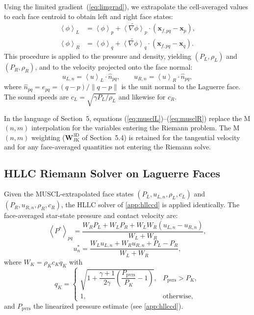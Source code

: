 \documentclass[twocolumn]{aastex63}
\newcommand{\vel}{{u}}
\newcommand{\vect}[1]{\mathbf{#1}}
\begin{document}
Using the limited gradient~(\ref{eq:limgrad}), we extrapolate
the cell-averaged values to each face centroid to obtain
left and right face states:
\begin{align}
  \left<\phi\right>_L &= \left<\phi\right>_p
    + \widetilde{\left<\nabla\phi\right>}_p \cdot
      (\vect{x}_{f,pq} - \vect{x}_p), \label{eq:musclL} \\
  \left<\phi\right>_R &= \left<\phi\right>_q
    + \widetilde{\left<\nabla\phi\right>}_q \cdot
      (\vect{x}_{f,pq} - \vect{x}_q). \label{eq:musclR}
\end{align}
This procedure is applied to the pressure and density,
yielding $(P_L,\rho_L)$ and $(P_R,\rho_R)$, and to the
velocity projected onto the face normal:
\begin{equation}\label{eq:vnorm}
  \vel_{L,n} = \left<\vel\right>_L \cdot \hat{n}_{pq},
  \qquad
  \vel_{R,n} = \left<\vel\right>_R \cdot \hat{n}_{pq},
\end{equation}
where $\hat{n}_{pq} = e_{pq} = (q - p)/\|q - p\|$ is the
unit normal to the Laguerre face.
The sound speeds are
$c_L = \sqrt{\gamma P_L / \rho_L}$ and likewise for $c_R$.

In the language of Section~5, equations
(\ref{eq:musclL})--(\ref{eq:musclR}) replace the
M$(n,m)$ interpolation for the variables entering the
Riemann problem.
The M$(n,m)$ weighting
($\boldsymbol{W}^\text{3D}_\text{JK}$
of Section~5.4) is retained for the
tangential velocity and for any face-averaged
quantities not entering the Riemann solve.


\subsection{HLLC Riemann Solver on Laguerre Faces}

Given the MUSCL-extrapolated face states
$(P_L, \vel_{L,n}, \rho_L, c_L)$ and
$(P_R, \vel_{R,n}, \rho_R, c_R)$,
the HLLC solver of \ref{app:hllccd} is applied
identically.
The face-averaged star-state pressure and contact velocity are:
\begin{equation}\label{eq:pstar3d}
  \left<P^*\right>_{pq}
  = \frac{W_R P_L + W_L P_R
    + W_L W_R(\vel_{L,n} - \vel_{R,n})}{W_L + W_R},
\end{equation}
\begin{equation}\label{eq:vstar3d}
  \vel^*_n
  = \frac{W_L\vel_{L,n} + W_R\vel_{R,n}
    + P_L - P_R}{W_L + W_R},
\end{equation}
where $W_K = \rho_K c_K q_K$ with
\begin{equation}
  q_K = \begin{cases}
    \sqrt{1 + \dfrac{\gamma+1}{2\gamma}
      \left(\dfrac{P_\textrm{pvrs}}{P_K}-1\right)},
    & P_\textrm{pvrs} > P_K, \\[6pt]
    1, & \text{otherwise},
  \end{cases}
\end{equation}
and $P_\textrm{pvrs}$ the linearized pressure estimate
(see \ref{app:hllccd}).
\end{document}
